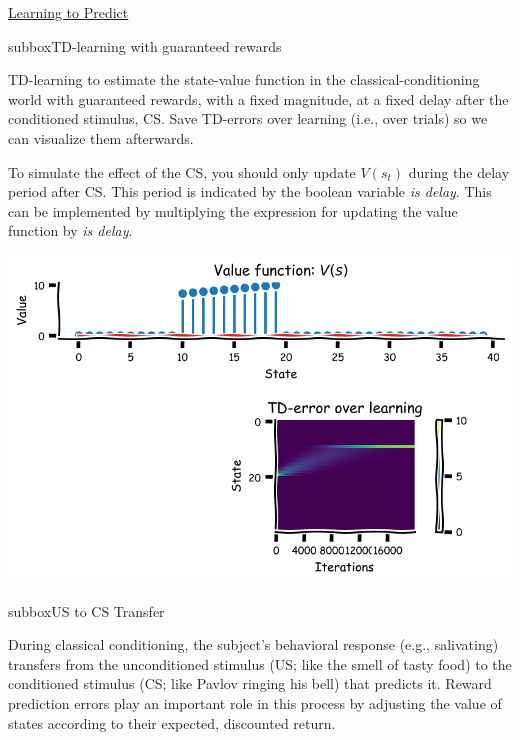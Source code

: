 \begin{textbox}{\href{https://compneuro.neuromatch.io/tutorials/W3D4_ReinforcementLearning/student/W3D4_Tutorial1.html}{Learning to Predict } }
\begin{subbox}{subbox}{TD-learning with guaranteed rewards}
\scriptsize

TD-learning to estimate the state-value function in the classical-conditioning world with guaranteed rewards, with a fixed magnitude, at a fixed delay after the conditioned stimulus, CS. Save TD-errors over learning (i.e., over trials) so we can visualize them afterwards. 

To simulate the effect of the CS, you should only update $V(s_{t})$ during the delay period after CS. This period is indicated by the boolean variable \textit{is delay}. This can be implemented by multiplying the expression for updating the value function by \textit{is delay}.

\begin{center}
    
\includegraphics[scale=0.18]{Figures/RL/RL_Figure1.png}
\end{center}

\end{subbox}
\begin{subbox}{subbox}{US to CS Transfer }
\scriptsize

During classical conditioning, the subject's behavioral response (e.g., salivating) transfers from the unconditioned stimulus (US; like the smell of tasty food) to the conditioned stimulus (CS; like Pavlov ringing his bell) that predicts it. Reward prediction errors play an important role in this process by adjusting the value of states according to their expected, discounted return.


\end{subbox}
\end{textbox}
